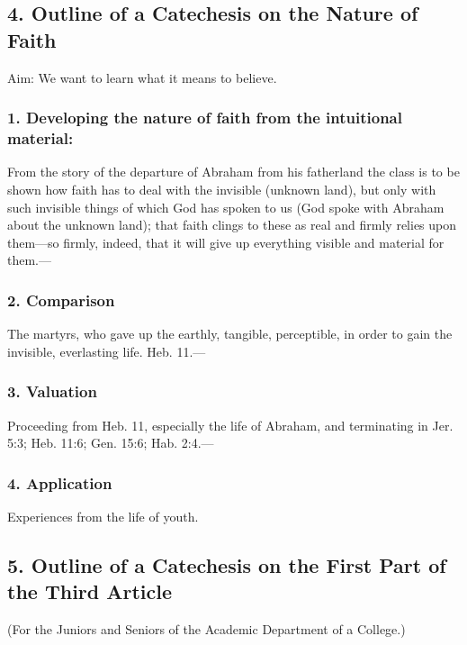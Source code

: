 \subsection[4. The Nature of Faith]{4. Outline of a Catechesis on the Nature of Faith}

Aim: We want to learn what it means to believe.

\subsubsection{1. Developing the nature of faith from the intuitional material:} From the story of the departure of Abraham from his fatherland the class is to be shown how faith has to deal with the invisible (unknown land), but only with such invisible things of which God has spoken to us (God spoke with Abraham about the unknown land); that faith clings to these as real and firmly relies upon them—so firmly, indeed, that it will give up everything visible and material for them.—

\subsubsection{2. Comparison} The martyrs, who gave up the earthly, tangible, perceptible, in order to gain the invisible, everlasting life. Heb. 11.—

\subsubsection{3. Valuation} Proceeding from Heb. 11, especially the life of Abraham, and terminating in Jer. 5:3; Heb. 11:6; Gen. 15:6; Hab. 2:4.—

\subsubsection{4. Application} Experiences from the life of youth.

\subsection[5. The First Part of the Third Article]{5. Outline of a Catechesis on the First Part of the Third Article}

(For the Juniors and Seniors of the Academic Department of a College.)

